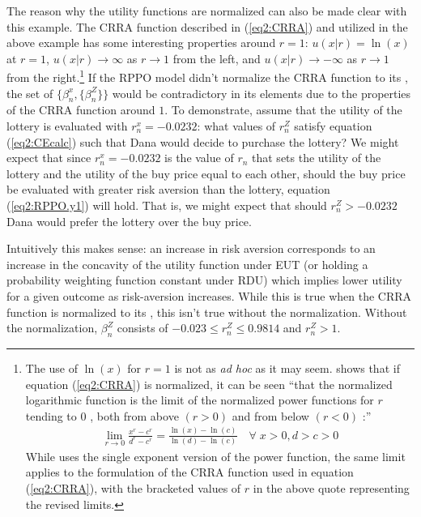 \documentclass[../main.tex]{subfiles}
\begin{document}
The reason why the utility functions are normalized can also be made clear with this  example.
The CRRA function described in (\ref{eq2:CRRA}) and utilized in the above example has some interesting properties around $r=1$: $u(x|r) = \ln(x)$ at $r=1$, $u(x|r) \to \infty$ as $r \to 1$ from the left, and $u(x|r) \to -\infty$ as $r \to 1$ from the right.\footnote{
	The use of $\ln(x)$ for $r =1$ is not as \textit{ad hoc} as it may seem.
	\textcite[1333]{Wakker2008} shows that if equation (\ref{eq2:CRRA}) is normalized, it can be seen \enquote{that the normalized logarithmic function is the limit of the normalized power functions for $r$ tending to $0$ , both from above $(r >0)$  and from below $(r<0)$ :}
	\begin{align*}
		\lim_{r \to 0} \frac{x^r - c^r}{d^r - c^r} = \frac{\ln(x) - \ln(c)}{\ln(d) - \ln(c)} \quad \forall \; x>0 , d>c>0
	\end{align*}
	While \textcite{Wakker2008} uses the single exponent version of the power function, the same limit applies to the formulation of the CRRA function used in equation (\ref{eq2:CRRA}), with the bracketed values of $r$ in the above quote representing the revised limits.
}
If the RPPO model didn't normalize the CRRA function to its {\CE}, the set of $\{\beta_n^x,\{\beta_n^Z\}\}$  would be contradictory in its elements due to the properties of the CRRA function around $1$.
To demonstrate, assume that the utility of the lottery is evaluated with $r_n^x = -0.0232$: what values of $r_n^Z$ satisfy equation (\ref{eq2:CEcalc}) such that Dana would decide to purchase the lottery? We might expect that since $r_n^x = -0.0232$ is the value of $r_n$ that sets the utility of the lottery and the utility of the buy price equal to each other,  should the buy price be evaluated with greater risk aversion than the lottery, equation (\ref{eq2:RPPO.y1}) will hold.
That is, we might expect that should $r_n^Z > -0.0232$ Dana would prefer the lottery over the buy price.

Intuitively this makes sense: an increase in risk aversion corresponds to an increase in the concavity of the utility function under EUT (or holding a probability weighting function constant under RDU) which implies lower utility for a given outcome as risk-aversion increases.
While this is true when the CRRA function is normalized to its {\CE}, this isn't true without the normalization.
Without the normalization, $\beta_n^Z$ consists of $-0.023 \leq r_n^Z \leq 0.9814$ and $r_n^Z > 1$.
\end{document}
